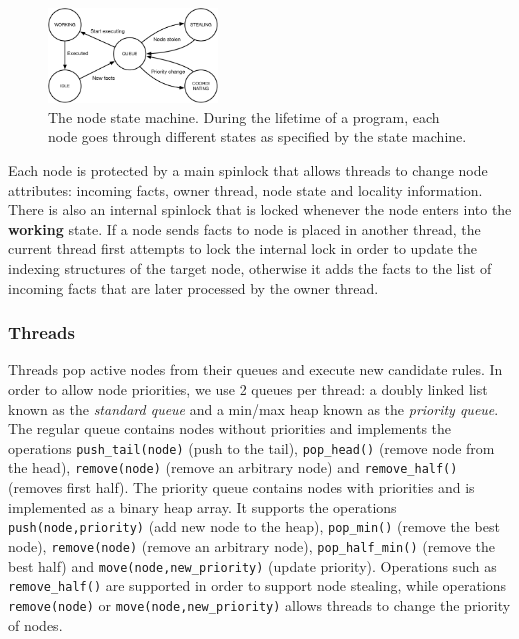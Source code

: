 \begin{figure}[h!]
   \centering
   \includegraphics[width=0.4\textwidth]{node_states.pdf}
   \caption{The node state machine. During the lifetime of a program, each node
   goes through different states as specified by the state machine.}
   \label{fig:node_states}
\end{figure}

Each node is protected by a main spinlock that allows threads to change node
attributes: incoming facts, owner thread, node state and locality information.
There is also an internal spinlock that is locked whenever the node enters into
the \textbf{working} state. If a node sends facts to node is placed in
another thread, the current thread first attempts to lock the internal lock in order to update the
indexing structures of the target node, otherwise it adds the facts to the list of
incoming facts that are later processed by the owner thread.

\subsubsection{Threads}

Threads pop active nodes from their queues and execute new candidate rules. 
In order to allow node priorities, we use 2 queues per thread: a doubly linked
list known as the \emph{standard
queue} and a min/max heap known as the \emph{priority queue}. The regular queue
contains nodes without priorities and
implements the operations \texttt{push\_tail(node)} (push to the tail),
\texttt{pop\_head()} (remove node from the head),
\texttt{remove(node)} (remove an arbitrary node) and \texttt{remove\_half()}
(removes first half). The priority queue contains nodes
with priorities and is implemented as a binary heap array. It supports the
operations \texttt{push(node,priority)} (add new node to the heap),
           \texttt{pop\_min()} (remove the best node),
\texttt{remove(node)} (remove an arbitrary node), \texttt{pop\_half\_min()}
(remove the best half) and \texttt{move(node,new\_priority)} (update priority).
Operations such as \texttt{remove\_half()} are supported in order to support
node stealing, while operations \texttt{remove(node)} or
\texttt{move(node,new\_priority)} allows threads to change the priority of
nodes.

